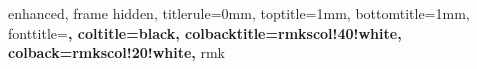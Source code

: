 {
    enhanced,
    frame hidden,
    titlerule=0mm,
    toptitle=1mm,
    bottomtitle=1mm,
    fonttitle=\bfseries\large,
    coltitle=black,
    colbacktitle=rmkscol!40!white,
    colback=rmkscol!20!white,
}{rmk}




















